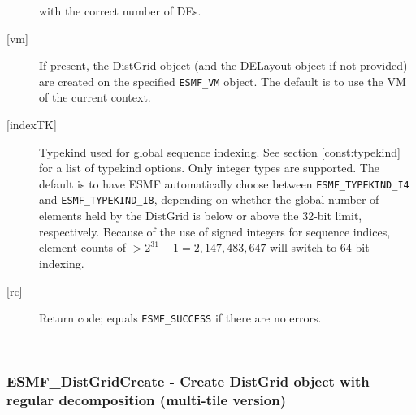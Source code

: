 \begin{description}
            with the correct number of DEs.
       \item[{[vm]}]
            If present, the DistGrid object (and the DELayout object if not 
            provided) are created on the specified {\tt ESMF\_VM} object. The 
            default is to use the VM of the current context. 
       \item[{[indexTK]}]
            Typekind used for global sequence indexing. See section 
            \ref{const:typekind} for a list of typekind options. Only integer
            types are supported. The default is to have ESMF automatically choose
            between {\tt ESMF\_TYPEKIND\_I4} and {\tt ESMF\_TYPEKIND\_I8},
            depending on whether the global number of elements held by the
            DistGrid is below or above the 32-bit limit, respectively.
            Because of the use of signed integers for sequence indices, 
            element counts of $ > 2^{31}-1 = 2,147,483,647$ will switch to 64-bit 
            indexing.
       \item[{[rc]}]
            Return code; equals {\tt ESMF\_SUCCESS} if there are no errors.
       \end{description}
   
 
\mbox{}\hrulefill\ 
 
\subsubsection [ESMF\_DistGridCreate] {ESMF\_DistGridCreate - Create DistGrid object with regular decomposition (multi-tile version)}


